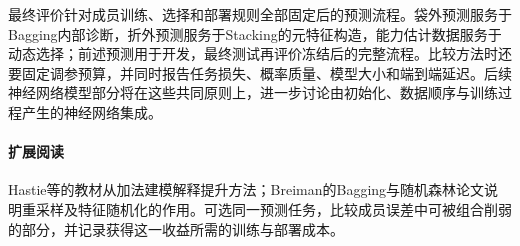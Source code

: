 最终评价针对成员训练、选择和部署规则全部固定后的预测流程。袋外预测服务于Bagging内部诊断，折外预测服务于Stacking的元特征构造，能力估计数据服务于动态选择；前述预测用于开发，最终测试再评价冻结后的完整流程。比较方法时还要固定调参预算，并同时报告任务损失、概率质量、模型大小和端到端延迟。后续神经网络模型部分将在这些共同原则上，进一步讨论由初始化、数据顺序与训练过程产生的神经网络集成。

\paragraph{扩展阅读}
Hastie等的教材从加法建模解释提升方法；Breiman的Bagging与随机森林论文说明重采样及特征随机化的作用。可选同一预测任务，比较成员误差中可被组合削弱的部分，并记录获得这一收益所需的训练与部署成本。

